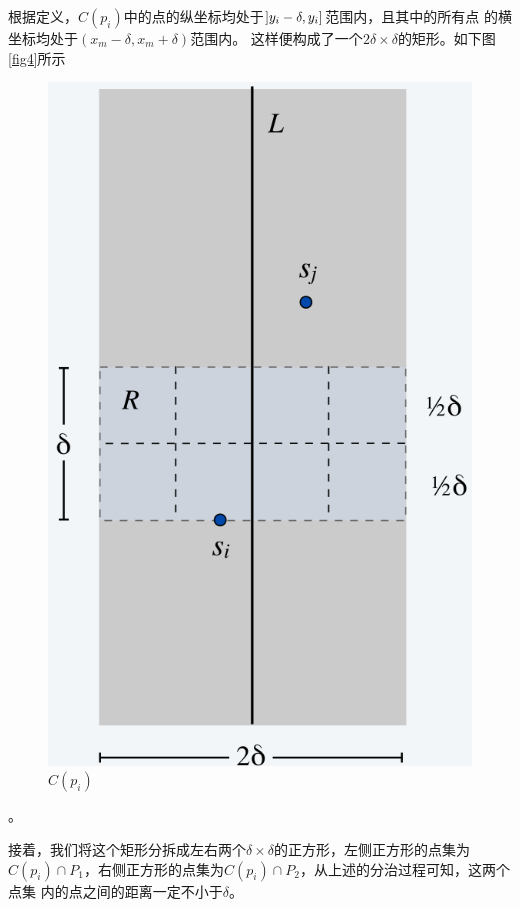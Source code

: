 根据定义，$C(p_i)$中的点的纵坐标均处于$\interval[open left]{y_i - \delta}{y_i}$范围内，且其中的所有点
的横坐标均处于$\left( x_m - \delta, x_m + \delta \right)$范围内。
这样便构成了一个$2\delta\times\delta$的矩形。如下图\autoref{fig4}所示
\begin{figure}[htb]
	\centering
	\includegraphics[scale=0.5]{image/NearestPointsCpi.png}
	\caption{$C(p_i)$}\label{fig4}
\end{figure}。

接着，我们将这个矩形分拆成左右两个$\delta \times \delta$的正方形，左侧正方形的点集为
$C(p_i)\cap P_1$，右侧正方形的点集为$C(p_i)\cap P_2$，从上述的分治过程可知，这两个点集
内的点之间的距离一定不小于$\delta$。

